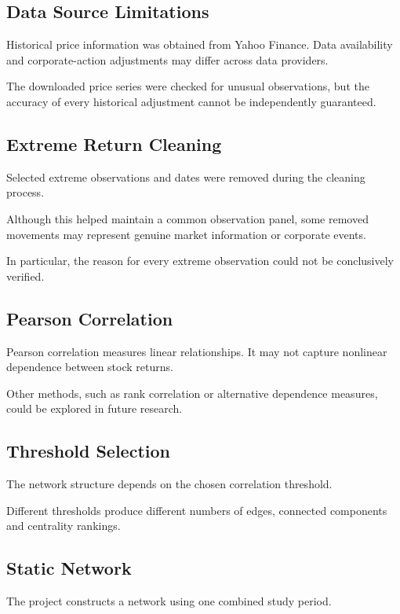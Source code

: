 \documentclass[11pt,a4paper]{article}
\begin{document}
\subsection{Data Source Limitations}

Historical price information was obtained from
Yahoo Finance. Data availability and corporate-action
adjustments may differ across data providers.

The downloaded price series were checked for
unusual observations, but the accuracy of every
historical adjustment cannot be independently
guaranteed.

\subsection{Extreme Return Cleaning}

Selected extreme observations and dates were removed
during the cleaning process.

Although this helped maintain a common observation
panel, some removed movements may represent genuine
market information or corporate events.

In particular, the reason for every extreme observation
could not be conclusively verified.

\subsection{Pearson Correlation}

Pearson correlation measures linear relationships.
It may not capture nonlinear dependence between
stock returns.

Other methods, such as rank correlation or
alternative dependence measures, could be explored
in future research.

\subsection{Threshold Selection}

The network structure depends on the chosen
correlation threshold.

Different thresholds produce different numbers
of edges, connected components and centrality
rankings.

\subsection{Static Network}

The project constructs a network using one
combined study period.
\end{document}
